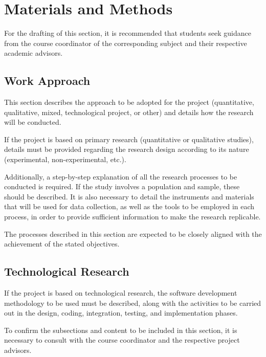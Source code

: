 \section{Materials and Methods}

For the drafting of this section, it is recommended that students seek guidance from the course coordinator of the corresponding subject and their respective academic advisors.

\subsection{Work Approach}

This section describes the approach to be adopted for the project (quantitative, qualitative, mixed, technological project, or other) and details how the research will be conducted.

If the project is based on primary research (quantitative or qualitative studies), details must be provided regarding the research design according to its nature (experimental, non-experimental, etc.).

Additionally, a step-by-step explanation of all the research processes to be conducted is required. If the study involves a population and sample, these should be described. It is also necessary to detail the instruments and materials that will be used for data collection, as well as the tools to be employed in each process, in order to provide sufficient information to make the research replicable.

The processes described in this section are expected to be closely aligned with the achievement of the stated objectives.

\subsection{Technological Research}

If the project is based on technological research, the software development methodology to be used must be described, along with the activities to be carried out in the design, coding, integration, testing, and implementation phases.

To confirm the subsections and content to be included in this section, it is necessary to consult with the course coordinator and the respective project advisors.
